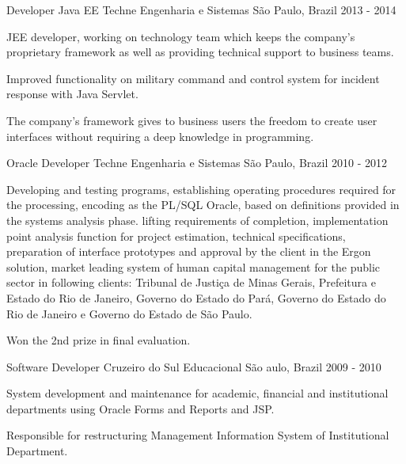 \begin{cventries}
  \cventry
    {Developer Java EE} %
    {Techne Engenharia e Sistemas} %
    {São Paulo, Brazil} %
    {2013 - 2014} %
    {
      \begin{cvitems} %
        \item {JEE developer, working on technology team which keeps the company's proprietary framework as well as providing technical support to business teams.}
        \item {Improved functionality on military command and control system for incident response with Java Servlet.}
        \item {The company's framework gives to business users the freedom to create user interfaces without requiring a deep knowledge in programming.}
      \end{cvitems}
    }

  \cventry
    {Oracle Developer} %
    {Techne Engenharia e Sistemas} %
	{São Paulo, Brazil} %
    {2010 - 2012} %
    {
      \begin{cvitems} %
        \item {Developing and testing programs, establishing operating procedures required for the processing, encoding as the PL/SQL Oracle, based on definitions provided in the systems analysis phase.
lifting requirements of completion, implementation point analysis function for project estimation, technical specifications, preparation of interface prototypes and approval by the client in the Ergon solution, market leading system of human capital management for the public sector in following clients: Tribunal de Justiça de Minas Gerais, Prefeitura e Estado do Rio de Janeiro, Governo do Estado do Pará, Governo do Estado do Rio de Janeiro e Governo do Estado de São Paulo.}
        \item {Won the 2nd prize in final evaluation.}
      \end{cvitems}
    }

  \cventry
    {Software Developer} %
    {Cruzeiro do Sul Educacional} %
    {São aulo, Brazil} %
    {2009 - 2010} %
    {
      \begin{cvitems} %
        \item {System development and maintenance for academic, financial and institutional departments using Oracle Forms and Reports and JSP.}
        \item {Responsible for restructuring Management Information System of Institutional Department.}
      \end{cvitems}
    }


\end{cventries}
